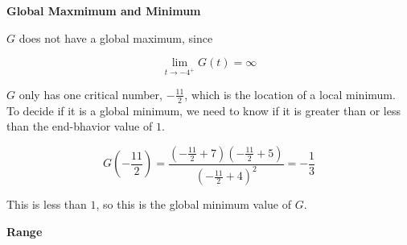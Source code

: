 \documentclass{ximera}
\begin{document}
\textbf{\textcolor{purple!85!blue}{Global Maxmimum and Minimum}} 

\begin{explanation}


$G$ does not have a global maximum, since 


\[
\lim\limits_{t \to -4^+} G(t) = \infty
\]


$G$ only has one critical number, $-\frac{11}{2}$, which is the location of a local minimum.  To decide if it is a global minimum, we need to know if it is greater than or less than the end-bhavior value of $1$.




\[
G\left( -\frac{11}{2} \right) = \frac{\left( -\frac{11}{2}+7 \right) \left( -\frac{11}{2}+5 \right)}{\left( -\frac{11}{2}+4 \right)^2} = -\frac{1}{3} 
\]


This is less than $1$, so this is the global minimum value of $G$. 



\end{explanation}














\textbf{\textcolor{purple!85!blue}{Range}} 
\end{document}
